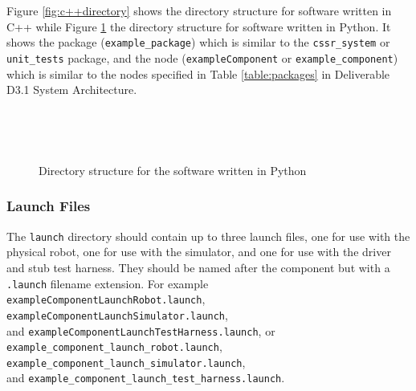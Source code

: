 \documentclass{CSSRforAfrica}
\begin{document}
\begin{appendices}
Figure \ref{fig:c++directory}  shows the directory structure for software written in C++ while Figure \ref{fig:pythondirectory}  the directory structure for software written in Python. It shows the package (\verb+example_package+) which is similar to the \verb+cssr_system+ or \verb+unit_tests+ package, and the node (\verb+exampleComponent+ or \verb+example_component+) which is similar to the nodes specified in Table \ref{table:packages} in Deliverable D3.1 System Architecture.


\newpage

\begin{figure}[thb]
 
\begin{multicols}{3}

~~~~~~~~~~~~~~~~~~~~~

\vspace{20cm}

\columnbreak

{\small 
{}
}

\columnbreak
~~~~~~~~~~~~~~~~~~~~~
\end{multicols}
\cprotect\caption{Directory structure for the  software written in Python}
\label{fig:pythondirectory}       

\end{figure}


\vspace{-3mm}
\subsubsection{Launch Files}
\label{section:launch_files}

The {\small \verb+launch+} directory should contain up to three launch files, one for use with the physical robot, one for use with the simulator, and one for use with the driver and stub test harness.  They should be named after the component but with a {\small \verb+.launch+} filename extension. For example \\
{\small \verb+exampleComponentLaunchRobot.launch+},
 {\small \verb+exampleComponentLaunchSimulator.launch+},   \\
and {\small \verb+exampleComponentLaunchTestHarness.launch+}, or\\
{\small \verb+example_component_launch_robot.launch+}, \\
 {\small \verb+example_component_launch_simulator.launch+},   \\
and {\small \verb+example_component_launch_test_harness.launch+}.  


\end{appendices}
\end{document}
